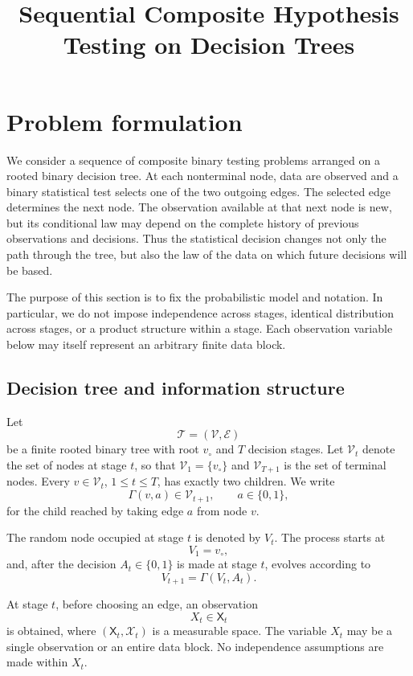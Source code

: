 \documentclass[11pt]{article}
\title{Sequential Composite Hypothesis Testing on Decision Trees}
\date{}
\newcommand{\cV}{\mathcal{V}}
\newcommand{\cE}{\mathcal{E}}
\begin{document}
\maketitle

\section{Problem formulation}
\label{sec:problem_formulation}

We consider a sequence of composite binary testing problems arranged on a rooted binary decision tree. At each nonterminal node, data are observed and a binary statistical test selects one of the two outgoing edges. The selected edge determines the next node. The observation available at that next node is new, but its conditional law may depend on the complete history of previous observations and decisions. Thus the statistical decision changes not only the path through the tree, but also the law of the data on which future decisions will be based.

The purpose of this section is to fix the probabilistic model and notation. In particular, we do not impose independence across stages, identical distribution across stages, or a product structure within a stage. Each observation variable below may itself represent an arbitrary finite data block.

\subsection{Decision tree and information structure}

Let
\[
\mathcal{T}=(\cV,\cE)
\]
be a finite rooted binary tree with root $v_{\circ}$ and $T$ decision stages. Let $\cV_t$ denote the set of nodes at stage $t$, so that $\cV_1=\{v_{\circ}\}$ and $\cV_{T+1}$ is the set of terminal nodes. Every $v\in\cV_t$, $1\le t\le T$, has exactly two children. We write
\[
\Gamma(v,a)\in\cV_{t+1},\qquad a\in\{0,1\},
\]
for the child reached by taking edge $a$ from node $v$.

The random node occupied at stage $t$ is denoted by $V_t$. The process starts at
\[
V_1=v_{\circ},
\]
and, after the decision $A_t\in\{0,1\}$ is made at stage $t$, evolves according to
\begin{equation}
V_{t+1}=\Gamma(V_t,A_t).
\label{eq:node_transition}
\end{equation}

At stage $t$, before choosing an edge, an observation
\[
X_t\in\mathsf{X}_t
\]
is obtained, where $(\mathsf{X}_t,\mathcal{X}_t)$ is a measurable space. The variable $X_t$ may be a single observation or an entire data block. No independence assumptions are made within $X_t$.
\end{document}
